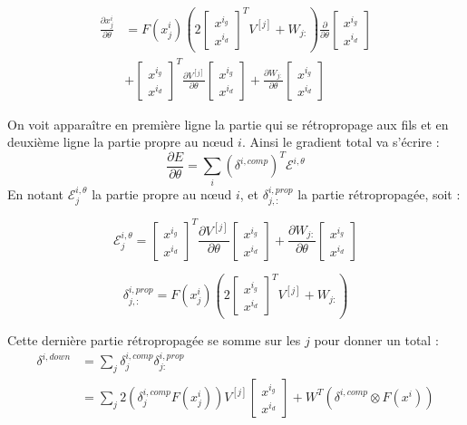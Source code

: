 \documentclass[conference]{IEEEtran}
\begin{document}
\begin{align*}
\frac{\partial x_j^i}{\partial \theta}&=F(x_j^i) \left( 2\begin{bmatrix} x^{i_g} \\ x^{i_d} \end{bmatrix}^T V^{[j]} +W_{j:}\right)\frac{\partial}{\partial\theta}\begin{bmatrix} x^{i_g} \\ x^{i_d} \end{bmatrix}\\
&+ \begin{bmatrix} x^{i_g} \\ x^{i_d} \end{bmatrix}^T \frac{\partial V^{[j]}}{\partial\theta}\begin{bmatrix} x^{i_g} \\ x^{i_d} \end{bmatrix} + \frac{\partial W_{j:}}{\partial\theta}\begin{bmatrix} x^{i_g} \\ x^{i_d} \end{bmatrix}
\end{align*}

On voit apparaître en première ligne la partie qui se rétropropage aux fils et en deuxième ligne la partie propre au nœud $i$. Ainsi le gradient total va s'écrire :
$$\frac{\partial E}{\partial\theta}=\sum_{i}(\delta^{i,comp})^T \mathcal{E}^{i,\theta}$$
En notant $\mathcal{E}_j^{i,\theta}$ la partie propre au nœud $i$, et $\delta_{j,:}^{i,prop}$ la partie rétropropagée, soit :

$$\mathcal{E}_j^{i,\theta}=\begin{bmatrix} x^{i_g} \\ x^{i_d} \end{bmatrix}^T \frac{\partial V^{[j]}}{\partial\theta}\begin{bmatrix} x^{i_g} \\ x^{i_d} \end{bmatrix} + \frac{\partial W_{j:}}{\partial\theta}\begin{bmatrix} x^{i_g} \\ x^{i_d} \end{bmatrix}$$

$$\delta_{j,:}^{i,prop}=F(x_j^i) \left( 2\begin{bmatrix} x^{i_g} \\ x^{i_d} \end{bmatrix}^T V^{[j]} +W_{j:}\right)$$

Cette dernière partie rétropropagée se somme sur les $j$ pour donner un total :
\begin{align*}
\delta^{i,down}&=\sum_j \delta^{i,comp}_j\delta^{i,prop}_{j:}\\
&=\sum_j 2(\delta_j^{i,comp} F(x^i_j)) V^{[j]}\begin{bmatrix} x^{i_g} \\ x^{i_d} \end{bmatrix}+W^T(\delta^{i,comp}\otimes F(x^i))
\end{align*}
\end{document}
